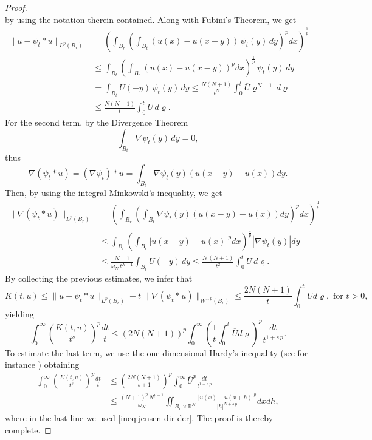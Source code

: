 \documentclass{amsart}
\theoremstyle{definition}
\numberwithin{equation}{section}
\begin{document}
\begin{proof}
\[	\]
	by using the notation therein contained. Along with Fubini's Theorem, we get 
	\[
	\begin{split}
		\| u - \psi_t \ast u\|_{L^p(B_r)} &= \left(\int_{B_r}\left(\int_{B_t} (u(x) - u(x-y))\,\psi_t(y)\,dy\right)^p dx\right)^{\frac{1}{p}} \\
		&\le \int_{B_t}\left(\int_{B_r}\left(u(x) - u(x-y)\right)^pdx\right)^{\frac{1}{p}}\,\psi_t(y)\,dy \\
		&= \int_{B_t} U(-y)\,\psi_t(y)\,dy \le \frac{N(N+1)}{t^N} \int_{0}^{t} \overline{U}\varrho^{N-1}\,d\varrho \\
		&\le \frac{N(N+1)}{t}\int_{0}^{t} \overline{U}\,d\varrho.
	\end{split}
	\]
	For the second term, by the Divergence Theorem  
	\[
	\int_{B_t} \nabla \psi_t(y)\,dy = 0,
	\]
	thus
	\[
	\nabla \left(\psi_t \ast u\right) = (\nabla \psi_t) \ast u = \int_{B_t} \nabla \psi_t(y)\left(u(x-y) - u(x)\right)dy.
	\]
	Then, by using the integral Minkowski's inequality, we get \[
	\begin{split}
		\|\nabla(\psi_t \ast u)\|_{L^p(B_r)}&= \left(\int_{B_r}\left(\int_{B_t} \nabla \psi_t(y)\left(u(x-y) - u(x)\right)dy\right)^{p} dx\right)^{\frac{1}{p}} \\
		&\le \int_{B_t} \left(\int_{B_r} |u(x-y) - u(x)|^pdx\right)^{\frac{1}{p}} \left|\nabla \psi_t(y)\right|dy \\
		&\le \frac{N+1}{\omega_N\,t^{N+1}} \int_{B_t} U(-y)\,dy \le \frac{N\,(N+1)}{t^2} \int_{0}^{t} \overline{U}\,d\varrho.
	\end{split}
	\]
	By collecting the previous estimates, we infer that 
	\begin{equation*}
		K(t, u) \le \|u - \psi_t \ast u\|_{L^p(B_r)} + t\,\|\nabla \left( \psi_t \ast u\right)\|_{W^{1,p}(B_r)} \le  \frac{2N(N+1)}{t} \int_{0}^t \overline{U}d\varrho, \mbox{ for } t > 0,
	\end{equation*}
	yielding 
	\[
	\int_{0}^{\infty} \left(\frac{K(t,u)}{t^s}\right)^p \frac{dt}{t} \le \left(2N(N+1)\right)^p\int_{0}^{\infty} \left(\frac{1}{t}\int_{0}^{t} \overline{U}d\varrho\right)^p\frac{dt}{t^{1+s\,p}}.
	\]
	To estimate the last term, we use the one-dimensional Hardy's inequality (see for instance \cite[Theorem C.41]{Leoni}) obtaining
	\[
	\begin{split}
		\int_{0}^{\infty} \left(\frac{K(t,u)}{t^s}\right)^p \frac{dt}{t} &\le \left(\frac{2N(N+1)}{s+1}\right)^p\int_0^{\infty} \overline{U}^p\frac{dt}{t^{1+s\,p}}\\
		&\le  \frac{\left(N+1\right)^p\,N^{p-1}}{\omega_N}\iint_{B_r \times \mathbb{R}^N} \frac{|u(x) - u(x+h)|^p}{|h|^{N+s\,p}}dxdh,
	\end{split}
	\]
	where in the last line we used \eqref{ineq:jensen-dir-der}. The proof is thereby complete. 
\end{proof}
\end{document}
